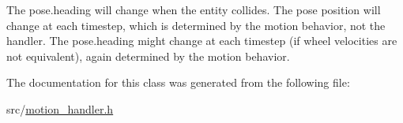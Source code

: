 The pose.\+heading will change when the entity collides. The pose position will change at each timestep, which is determined by the motion behavior, not the handler. The pose.\+heading might change at each timestep (if wheel velocities are not equivalent), again determined by the motion behavior. 

The documentation for this class was generated from the following file\+:\begin{DoxyCompactItemize}
\item 
src/\mbox{\hyperlink{motion__handler_8h}{motion\+\_\+handler.\+h}}\end{DoxyCompactItemize}
